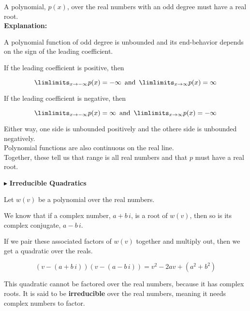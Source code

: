 \documentclass{ximera}
\begin{document}
\begin{explanation}


A polynomial, $p(x)$, over the real numbers with an odd degree must have a real root. \\



\textbf{Explanation: }



A polynomial function of odd degree is unbounded and its end-behavior depends on the sign of the leading coefficient.



If the leading coefficient is positive, then 

\[   \limlimits_{x \to -\infty} p(x) = -\infty    \,   \text{ and } \,       \limlimits_{x \to \infty} p(x) = \infty      \]



If the leading coefficient is negative, then 

\[   \limlimits_{x \to -\infty} p(x) = \infty    \,   \text{ and } \,       \limlimits_{x \to \infty} p(x) = -\infty      \]


Either way, one side is unbounded positively and the othere side is unbounded negatively. \\



Polynomial functions are also continuous on the real line. \\


Together, these tell us that range is all real numbers and that $p$ must have a real root.




\end{explanation}








$\blacktriangleright$  \textbf{Irreducible Quadratics}


Let $w(v)$ be a polynomial over the real numbers.

We know that if a complex number, $a + b \, i$, is a root of $w(v)$, then so is its complex conjugate, $a - b \,i$.

If we pair these associated factors of $w(v)$ together and multiply out, then we get a quadratic over the reals.

\[    (v - (a + b \, i)) (v -(a - b \, i))  = v^2 - 2a v + (a^2 + b^2)      \]


This quadratic cannot be factored over the real numbers, because it has complex roots.  It is said to be \textbf{irreducible} over the real numbers, meaning it needs complex numbers to factor.
\end{document}
